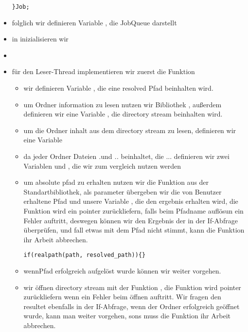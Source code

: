 \begin{itemize}
\begin{lstlisting}
}Job;
\end{lstlisting}
	\item folglich wir definieren Variable , die JobQueue darstellt
	\item in  inizialisieren wir 
	\item
	\item für den Leser-Thread implementieren wir zuerst die Funktion 
	\begin{itemize}
		\item wir definieren Variable ,
		die eine resolved Pfad beinhalten wird.
		\item um Ordner information zu lesen nutzen wir Bibliothek ,
		außerdem definieren wir eine Variable  , die directory stream beinhalten wird.
		\item um die Ordner inhalt aus dem directory stream zu lesen,
		definieren wir eine Variable 
		\item da jeder Ordner Dateien \textit{.}und \textit{..} beinhaltet, die ...
		definieren wir zwei Variablen  und ,
		die wir zum vergleich nutzen werden
		\item um absolute pfad zu erhalten nutzen wir die Funktion  aus der Standartbibliothek,
		als parameter übergeben wir die von Benutzer erhaltene Pfad 
		und unsere Variable , die den ergebnis erhalten wird,
		die Funktion wird ein  pointer zurückliefern, falls beim Pfadname auflösun ein Fehler auftritt,
		deswegen können wir den Ergebnis der  in der If-Abfrage überprüfen,
		und fall etwas mit dem Pfad nicht stimmt, kann die Funktion  ihr Arbeit abbrechen.
	\begin{lstlisting}
if(realpath(path, resolved_path)){}
	\end{lstlisting}
		\item wennPfad erfolgreich aufgelöst wurde können wir weiter vorgehen.
		\item wir öffnen directory stream mit der Funktion ,
		die Funktion wird  pointer zurückliefern wenn ein Fehler beim öffnen auftritt.
		Wir fragen den resultet ebenfalls in der If-Abfrage, wenn der Ordner erfolgreich geöffnet wurde,
		kann man weiter vorgehen, sons muss die Funktion  ihr Arbeit abbrechen.

\end{itemize}
\end{itemize}
